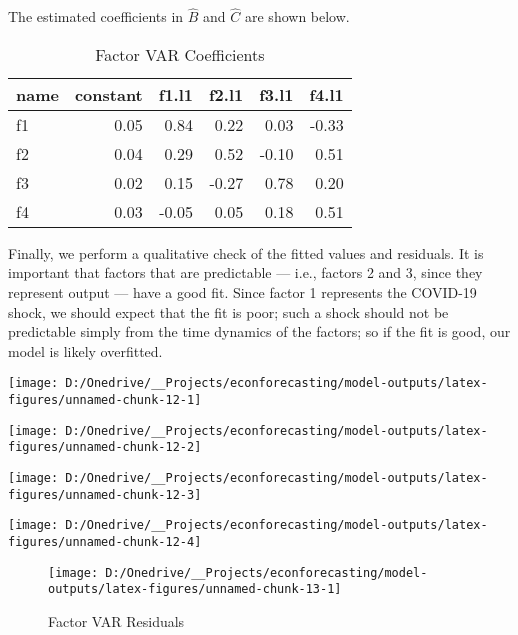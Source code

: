 \documentclass[11pt, letterpaper]{article}\usepackage[]{graphicx}\usepackage[]{color}
\begin{document}
The estimated coefficients in $\widehat{B}$ and $\widehat{C}$ are shown below.
\begin{table}[H]
\centering
\begingroup\footnotesize
\begin{tabular}{lrrrrr}
  \hline
name & constant & f1.l1 & f2.l1 & f3.l1 & f4.l1 \\ 
  \hline
f1 & 0.05 & 0.84 & 0.22 & 0.03 & -0.33 \\ 
  f2 & 0.04 & 0.29 & 0.52 & -0.10 & 0.51 \\ 
  f3 & 0.02 & 0.15 & -0.27 & 0.78 & 0.20 \\ 
  f4 & 0.03 & -0.05 & 0.05 & 0.18 & 0.51 \\ 
   \hline
\end{tabular}
\endgroup
\caption{Factor VAR Coefficients} 
\end{table}



Finally, we perform a qualitative check of the fitted values and residuals. It is important that factors that are predictable --- i.e., factors 2 and 3, since they represent output --- have a good fit. Since factor 1 represents the COVID-19 shock, we should expect that the fit is poor; such a shock should not be predictable simply from the time dynamics of the factors; so if the fit is good, our model is likely overfitted.


{\centering \texttt{[image: D:/Onedrive/\_\_Projects/econforecasting/model-outputs/latex-figures/unnamed-chunk-12-1]} 

}




{\centering \texttt{[image: D:/Onedrive/\_\_Projects/econforecasting/model-outputs/latex-figures/unnamed-chunk-12-2]} 

}




{\centering \texttt{[image: D:/Onedrive/\_\_Projects/econforecasting/model-outputs/latex-figures/unnamed-chunk-12-3]} 

}




{\centering \texttt{[image: D:/Onedrive/\_\_Projects/econforecasting/model-outputs/latex-figures/unnamed-chunk-12-4]} 

}





\begin{figure}[H]

{\centering \texttt{[image: D:/Onedrive/\_\_Projects/econforecasting/model-outputs/latex-figures/unnamed-chunk-13-1]} 

}

\caption[Factor VAR Residuals]{Factor VAR Residuals}\label{fig:unnamed-chunk-13}
\end{figure}
\end{document}
